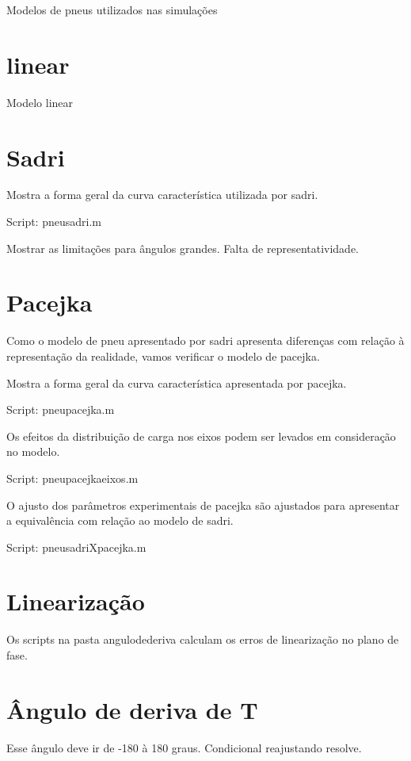 \documentclass[sublist]{fei}
\begin{document}
Modelos de pneus utilizados nas simulações

\section{linear}

Modelo linear 

\section{Sadri}

Mostra a forma geral da curva característica utilizada por sadri.

Script: pneusadri.m

Mostrar as limitações para ângulos grandes. Falta de representatividade.

\section{Pacejka}

Como o modelo de pneu apresentado por sadri apresenta diferenças com relação à representação da realidade, vamos verificar o modelo de pacejka.

Mostra a forma geral da curva característica apresentada por pacejka.

Script: pneupacejka.m

Os efeitos da distribuição de carga nos eixos podem ser levados em consideração no modelo. 

Script: pneupacejkaeixos.m

O ajusto dos parâmetros experimentais de pacejka são ajustados para apresentar a equivalência com relação ao modelo de sadri.

Script: pneusadriXpacejka.m

\section{Linearização}

Os scripts na pasta angulodederiva calculam os erros de linearização no plano de fase.


\section{Ângulo de deriva de T}

Esse ângulo deve ir de -180 à 180 graus. Condicional reajustando resolve.
\end{document}
